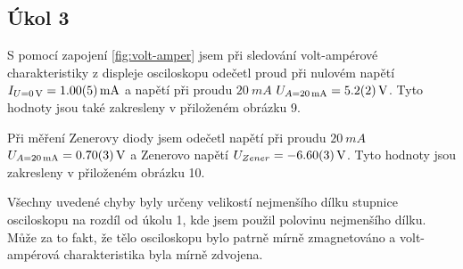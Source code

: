 \documentclass[0-protokol.tex]{subfiles}
\begin{document}
\subsection*{Úkol 3}
S pomocí zapojení \ref{fig:volt-amper} jsem při sledování volt-ampérové charakteristiky z displeje osciloskopu odečetl proud při nulovém napětí $I_{U=\SI{0}{V}} = \SI{1 \pm 0,05}{mA}$ a napětí při proudu $\SI{20}{mA}$ $U_{A=\SI{20}{mA}} = \SI{5,2 \pm 0,2}{V}$. Tyto hodnoty jsou také zakresleny v přiloženém obrázku 9.

Při měření Zenerovy diody jsem odečetl napětí při proudu $\SI{20}{mA}$ $U_{A=\SI{20}{mA}} = \SI{0,7 \pm 0,03}{V}$ a Zenerovo napětí $U_{Zener} = \SI{-6,6 \pm 0,03}{V}$. Tyto hodnoty jsou zakresleny v přiloženém obrázku 10.

Všechny uvedené chyby byly určeny velikostí nejmenšího dílku stupnice osciloskopu na rozdíl od úkolu 1, kde jsem použil polovinu nejmenšího dílku. Může za to fakt, že tělo osciloskopu bylo patrně mírně zmagnetováno a volt-ampérová charakteristika byla mírně zdvojena. 
\end{document}

